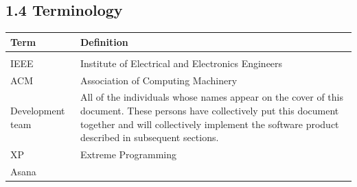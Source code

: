 \documentclass[]{article}
\begin{document}
\subsection{1.4 Terminology}\label{terminology}
\begin{longtable}[c]{@{}ll@{}}
\toprule\addlinespace
\begin{minipage}[t]{0.47\columnwidth}\raggedright
Term
\end{minipage} & \begin{minipage}[t]{0.47\columnwidth}\raggedright
Definition
\end{minipage}
\\
\hline
\\\addlinespace
\begin{minipage}[t]{0.47\columnwidth}\raggedright
IEEE
\end{minipage} & \begin{minipage}[t]{0.47\columnwidth}\raggedright
Institute of Electrical and Electronics Engineers
\end{minipage}
\\\addlinespace
\begin{minipage}[t]{0.47\columnwidth}\raggedright
ACM
\end{minipage} & \begin{minipage}[t]{0.47\columnwidth}\raggedright
Association of Computing Machinery
\end{minipage}
\\\addlinespace
\begin{minipage}[t]{0.47\columnwidth}\raggedright
Development team
\end{minipage} & \begin{minipage}[t]{0.47\columnwidth}\raggedright
All of the individuals whose names appear on the cover of this document.
These persons have collectively put this document together and will
collectively implement the software product described in subsequent
sections.
\end{minipage}
\\\addlinespace
\begin{minipage}[t]{0.47\columnwidth}\raggedright
XP
\end{minipage} & \begin{minipage}[t]{0.47\columnwidth}\raggedright
Extreme Programming
\end{minipage}
\\\addlinespace
\begin{minipage}[t]{0.47\columnwidth}\raggedright
Asana
\end{minipage} & \begin{minipage}[t]{0.47\columnwidth}\raggedright

\end{minipage}
\end{longtable}
\end{document}
